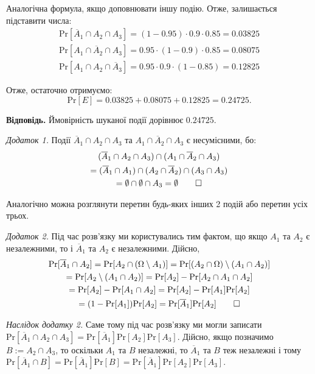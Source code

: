 \documentclass[oneside,solution]{karazin-prob-theory-assign}
\begin{document}
Аналогічна формула, якщо доповнювати іншу подію. Отже, залишається підставити числа:
\begin{gather}
    \text{Pr}[\overline{A}_1 \cap A_2 \cap A_3] = (1 - 0.95) \cdot 0.9 \cdot 0.85 = 0.03825 \\
    \text{Pr}[A_1 \cap \overline{A}_2 \cap A_3] = 0.95 \cdot (1-0.9) \cdot 0.85 = 0.08075 \\
    \text{Pr}[A_1 \cap A_2 \cap \overline{A}_3] = 0.95 \cdot 0.9 \cdot (1-0.85) = 0.12825
\end{gather}

Отже, остаточно отримуємо:
\begin{equation}
    \text{Pr}[E] = 0.03825 + 0.08075 + 0.12825 = \boxed{0.24725}.
\end{equation}

\textbf{Відповідь.} Ймовірність шуканої події дорівнює $0.24725$. 

\textit{Додаток 1.} Події $\overline{A}_1 \cap A_2 \cap A_3$ та $A_1 \cap \overline{A}_2 \cap A_3$ є несумісними, бо:
\begin{gather}
    (\overline{A}_1 \cap A_2 \cap A_3) \cap (A_1 \cap \overline{A}_2 \cap A_3) \nonumber \\
    = (\overline{A}_1 \cap A_1) \cap (A_2 \cap \overline{A}_2) \cap (A_3 \cap A_3) \nonumber \\
    = \emptyset \cap \emptyset \cap A_3 = \emptyset \qed
\end{gather}

Аналогічно можна розглянути перетин будь-яких інших 2 подій або перетин усіх трьох. 

\textit{Додаток 2.} Під час розв'язку ми користувались тим фактом, що якщо $A_1$ та $A_2$ є незалежними, то і $\overline{A}_1$ та $A_2$ є незалежними. Дійсно,
\begin{gather}
    \text{Pr}[\overline{A}_1 \cap A_2] = \text{Pr}[A_2 \cap (\Omega \setminus A_1)] = \text{Pr}[(A_2 \cap \Omega) \setminus (A_1 \cap A_2)] \nonumber \\
    = \text{Pr}[A_2 \setminus (A_1 \cap A_2)] = \text{Pr}[A_2] - \text{Pr}[A_2 \cap A_1 \cap A_2] \nonumber \\
    = \text{Pr}[A_2] - \text{Pr}[A_1 \cap A_2] = \text{Pr}[A_2] - \text{Pr}[A_1]\text{Pr}[A_2] \nonumber \\
    = (1-\text{Pr}[A_1])\text{Pr}[A_2] = \text{Pr}[\overline{A}_1]\text{Pr}[A_2] \qed
\end{gather}

\textit{Наслідок додатку 2.} Саме тому під час розв'язку ми могли записати $\text{Pr}[\overline{A}_1 \cap A_2 \cap A_3] = \text{Pr}[\overline{A}_1]\text{Pr}[A_2]\text{Pr}[A_3]$. Дійсно, якщо позначимо $B:=A_2 \cap A_3$, то оскільки $A_1$ та $B$ незалежні, то $\overline{A}_1$ та $B$ теж незалежні і тому $\text{Pr}[\overline{A}_1 \cap B] = \text{Pr}[\overline{A}_1]\text{Pr}[B] = \text{Pr}[\overline{A}_1]\text{Pr}[A_2]\text{Pr}[A_3]$.
\end{document}
